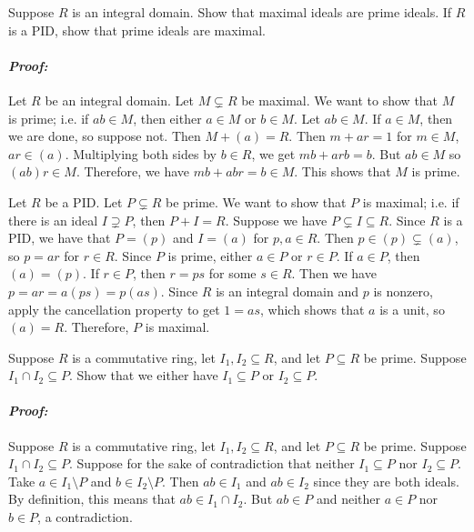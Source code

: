 \documentclass [12pt] {article}
\renewcommand{\it}[1]{\textit{{#1}}}
\newenvironment{problem}{\begin{tcolorbox}[title=Problem,colback=black!5!white,colframe=black!75!black]}{\end{tcolorbox}}
\newenvironment{response}{\begin{responseframe}\vspace{-10pt}\paragraph{\it{Proof:}}}{\end{responseframe}}
\begin{document}
\begin{problem}
    Suppose $R$ is an integral domain. Show that maximal ideals are prime
    ideals. If $R$ is a PID, show that prime ideals are maximal.
\end{problem}
\begin{response}
    Let $R$ be an integral domain. Let $M\subsetneq R$ be maximal. We want to
    show that $M$ is prime; i.e. if $ab\in M$, then either $a\in M$ or $b\in M$.
    Let $ab\in M$. If $a\in M$, then we are done, so suppose not. Then
    $M+(a)=R$. Then $m+ar=1$ for $m\in M$, $ar\in (a)$. Multiplying both sides
    by $b\in R$, we get $mb+arb=b$. But $ab\in M$ so $(ab)r\in M$. Therefore, we
    have $mb+abr = b\in M$. This shows that $M$ is prime.
    \vspace{1em}

    Let $R$ be a PID. Let $P\subsetneq R$ be prime. We want to show that $P$ is
    maximal; i.e. if there is an ideal $I\supsetneq P$, then $P+I=R$. Suppose we
    have $P\subsetneq I\subseteq R$. Since $R$ is a PID, we have that $P=(p)$
    and $I=(a)$ for $p,a\in R$. Then $p\in (p)\subsetneq (a)$, so $p=ar$ for
    $r\in R$. Since $P$ is prime, either $a\in P$ or $r\in P$. If $a\in P$, then
    $(a)=(p)$. If $r\in P$, then $r=ps$ for some $s\in R$. Then we have
    $p=ar=a(ps)=p(as)$. Since $R$ is an integral domain and $p$ is nonzero,
    apply the cancellation property to get $1=as$, which shows that $a$ is a
    unit, so $(a)=R$. Therefore, $P$ is maximal.
\end{response}

\newpage
\begin{problem}
    Suppose $R$ is a commutative ring, let $I_1,I_2\subseteq R$, and let
    $P\subseteq R$ be prime. Suppose $I_1\cap I_2\subseteq P$. Show that we
    either have $I_1\subseteq P$ or $I_2\subseteq P$.
\end{problem}
\begin{response}
    Suppose $R$ is a commutative ring, let $I_1,I_2\subseteq R$, and let
    $P\subseteq R$ be prime. Suppose $I_1\cap I_2\subseteq P$. Suppose for the
    sake of contradiction that neither $I_1\subseteq P$ nor $I_2\subseteq P$.
    Take $a\in I_1\setminus P$ and $b\in I_2\setminus P$. Then $ab\in I_1$ and
    $ab\in I_2$ since they are both ideals. By definition, this means that
    $ab\in I_1\cap I_2$. But $ab\in P$ and neither $a\in P$ nor $b\in P$, a
    contradiction.
\end{response}
\end{document}

